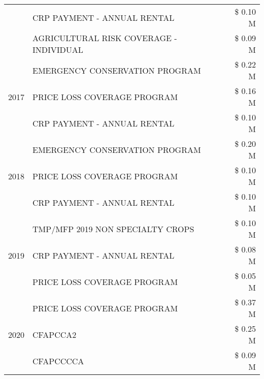\begin{tabular}{llr}
 & CRP PAYMENT - ANNUAL RENTAL                   & \$ 0.10 M \\
 & AGRICULTURAL RISK COVERAGE - INDIVIDUAL       & \$ 0.09 M \\
\cline{1-3}
\multirow[t]{3}{*}{2017} & EMERGENCY CONSERVATION PROGRAM & \$ 0.22 M \\
 & PRICE LOSS COVERAGE PROGRAM & \$ 0.16 M \\
 & CRP PAYMENT - ANNUAL RENTAL & \$ 0.10 M \\
\cline{1-3}
\multirow[t]{3}{*}{2018} & EMERGENCY CONSERVATION PROGRAM & \$ 0.20 M \\
 & PRICE LOSS COVERAGE PROGRAM & \$ 0.10 M \\
 & CRP PAYMENT - ANNUAL RENTAL & \$ 0.10 M \\
\cline{1-3}
\multirow[t]{3}{*}{2019} & TMP/MFP 2019 NON SPECIALTY CROPS & \$ 0.10 M \\
 & CRP PAYMENT - ANNUAL RENTAL & \$ 0.08 M \\
 & PRICE LOSS COVERAGE PROGRAM & \$ 0.05 M \\
\cline{1-3}
\multirow[t]{3}{*}{2020} & PRICE LOSS COVERAGE PROGRAM & \$ 0.37 M \\
 & CFAPCCA2 & \$ 0.25 M \\
 & CFAPCCCCA & \$ 0.09 M \\
\cline{1-3}
\bottomrule
\end{tabular}
